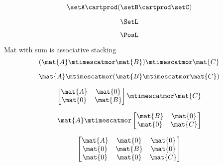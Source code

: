 {\begin{forslides}
        \begin{equation}
            \label{eq:parallelism-048}
            \setA \cartprod (\setB \cartprod \setC)
        \end{equation}

        \begin{equation}
            \label{eq:parallelism-049}
            \SetL
        \end{equation}

        \begin{equation}
            \label{eq:parallelism-050}
            \PosL
        \end{equation}

        Mat with sum is associative stacking
        \begin{equation}
            \label{eq:parallelism-051}
            ( \mat{A} \mtimescatmor \mat{B} ) \mtimescatmor \mat{C}
        \end{equation}

        \begin{equation}
            \label{eq:parallelism-052}
            \mat{A} \mtimescatmor ( \mat{B} \mtimescatmor \mat{C} )
        \end{equation}

        \begin{equation}
            \label{eq:parallelism-053}
            \begin{bmatrix}
                \mat{A} & \mat{0} \\
                \mat{0} & \mat{B}
            \end{bmatrix}
            \mtimescatmor \mat{C}
        \end{equation}

        \begin{equation}
            \label{eq:parallelism-054}
            \mat{A} \mtimescatmor
            \begin{bmatrix}
                \mat{B} & \mat{0} \\
                \mat{0} & \mat{C}
            \end{bmatrix}
        \end{equation}

        \begin{equation}
            \label{eq:parallelism-055}
            \begin{bmatrix}
                \mat{A} & \mat{0} & \mat{0} \\
                \mat{0} & \mat{B} & \mat{0} \\
                \mat{0} & \mat{0} & \mat{C}
            \end{bmatrix}
        \end{equation}


\end{forslides}}
